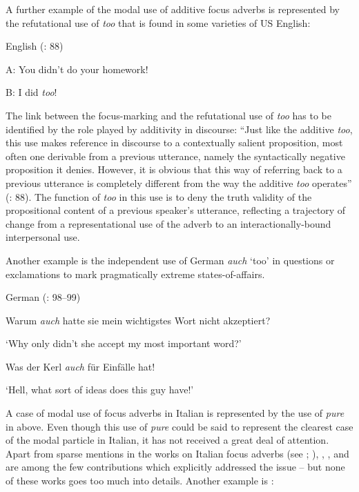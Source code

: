 A further example of the modal use of additive focus adverbs is represented by the refutational use of \textit{too} that is found in some varieties of US English:

\ea%
    \label{ex:key:21}

          English (\citealt{SchwenterWaltereit2010}: 88)

A:  You didn’t do your homework!

B:  I did \textit{too}!
    \z

The link between the focus-marking and the refutational use of \textit{too} has to be identified by the role played by additivity in discourse: “Just like the additive \textit{too}, this use makes reference in discourse to a contextually salient proposition, most often one derivable from a previous utterance, namely the syntactically negative proposition it denies. However, it is obvious that this way of referring back to a previous utterance is completely different from the way the additive \textit{too} operates” (\citealt{SchwenterWaltereit2010}: 88). The function of \textit{too} in this use is to deny the truth validity of the propositional content of a previous speaker’s utterance, reflecting a trajectory of change from a representational use of the adverb to an interactionally-bound interpersonal use.

Another example is the independent use of German \textit{auch} ‘too’ in questions  or exclamations  to mark pragmatically extreme states-of-affairs.

\ea%
    \label{ex:key:22}

          German (\citealt{SchwenterWaltereit2010}: 98–99)

\ea\label{ex:key:22a}  Warum \textit{auch} hatte sie mein wichtigstes Wort nicht akzeptiert?

     ‘Why only didn’t she accept my most important word?’

\ex\label{ex:key:22b}     Was der Kerl \textit{auch} für Einfälle hat!

\glt ‘Hell, what sort of ideas does this guy have!’
    \z
    \z

A case of modal use of focus adverbs in Italian is represented by the use of \textit{pure} in  above. Even though this use of \textit{pure} could be said to represent the clearest case of the modal particle in Italian, it has not received a great deal of attention. Apart from sparse mentions in the works on Italian focus adverbs (see \citealt{Andorno2000}; \citealt{Ricca2017}), \citet{Held1983}, \citet[107–108]{Waltereit2006}, and \citet[115–118]{Coniglio2008} are among the few contributions which explicitly addressed the issue – but none of these works goes too much into details. Another example is :


